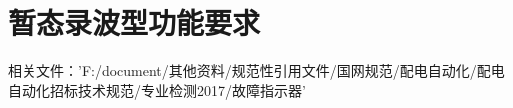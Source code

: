 \documentclass{article}
\begin{document}
\begin{CJK}{UTF8}{gbsn}
\begin{enumerate}
\end{enumerate}
\section{暂态录波型功能要求}


相关文件：'F:/document/其他资料/规范性引用文件/国网规范/配电自动化/配电自动化招标技术规范/专业检测2017/故障指示器'
\end{CJK}
\end{document}
